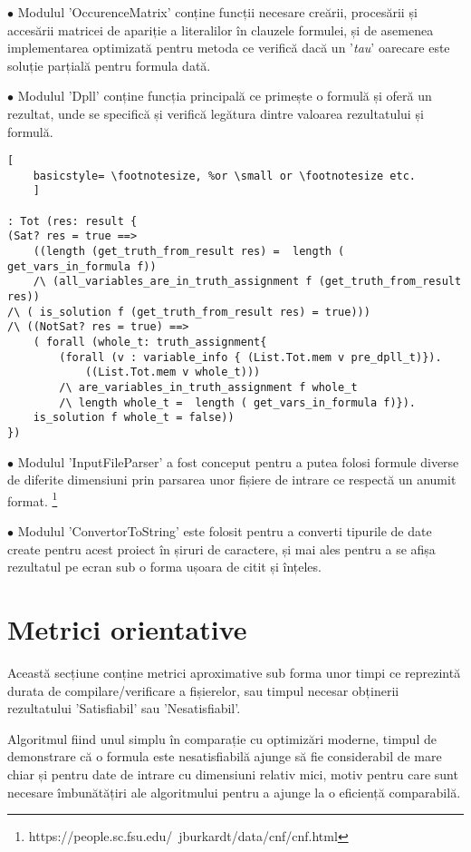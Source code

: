 $\bullet$ Modulul 'OccurenceMatrix' conține funcții necesare creării, procesării și accesării matricei de apariție a literalilor în clauzele formulei, și de asemenea implementarea optimizată pentru metoda ce verifică dacă un '\textit{tau}' oarecare este soluție parțială pentru formula dată.

$\bullet$ Modulul 'Dpll' conține funcția principală ce primește o formulă și oferă un \newline rezultat, unde se specifică și verifică legătura dintre valoarea rezultatului și formulă.

\begin{lstlisting}[
	basicstyle= \footnotesize, %or \small or \footnotesize etc.
	]

: Tot (res: result {
(Sat? res = true ==> 
	((length (get_truth_from_result res) = 	length ( get_vars_in_formula f)) 
	/\ (all_variables_are_in_truth_assignment f (get_truth_from_result res)) 
/\ ( is_solution f (get_truth_from_result res) = true)))
/\ ((NotSat? res = true) ==> 
	( forall (whole_t: truth_assignment{ 
		(forall (v : variable_info { (List.Tot.mem v pre_dpll_t)}). 
			((List.Tot.mem v whole_t)))
		/\ are_variables_in_truth_assignment f whole_t 
		/\ length whole_t =  length ( get_vars_in_formula f)}). 
	is_solution f whole_t = false))
})  

\end{lstlisting}

$\bullet$ Modulul 'InputFileParser' a fost conceput pentru a putea folosi formule diverse de diferite dimensiuni prin parsarea unor fișiere de intrare ce respectă un anumit format. \footnote{https://people.sc.fsu.edu/~jburkardt/data/cnf/cnf.html}

 $\bullet$ Modulul 'ConvertorToString' este folosit pentru a converti tipurile de date create pentru acest proiect în șiruri de caractere, și mai ales pentru a se afișa rezultatul pe ecran sub o forma ușoara de citit și înțeles.


\section{Metrici orientative}

Această secțiune conține metrici aproximative sub forma unor timpi ce reprezintă durata de compilare/verificare a fișierelor, sau timpul necesar obținerii rezultatului 'Satisfiabil' sau 'Nesatisfiabil'.

Algoritmul fiind unul simplu în comparație cu optimizări moderne, timpul de demonstrare că o formula este nesatisfiabilă ajunge să fie considerabil de mare chiar și pentru date de intrare cu dimensiuni relativ mici, motiv pentru care sunt necesare îmbunătățiri ale algoritmului pentru a ajunge la o eficiență comparabilă.

